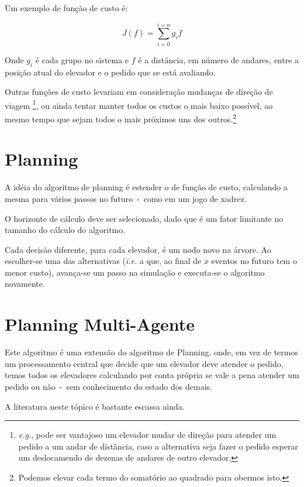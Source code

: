 Um exemplo de função de custo é:

\[
  J(f) = \sum_{i=0}^{i=n} g_{i}f
\]

Onde $g_{i}$ é cada grupo no sistema e $f$ é a distância, em número de andares,
entre a posição atual do elevador e o pedido que se está avaliando.

Outras funções de custo levariam em consideração mudanças de direção de viagem
\footnote{\textit{e.g.}, pode ser vantajoso um elevador mudar de direção para atender um
pedido a um andar de distância, caso a alternativa seja fazer o pedido esperar
um deslocamendo de dezenas de andares de outro elevador.}, ou ainda tentar
manter todos os custos o mais baixo possível, ao mesmo tempo que sejam todos o
mais próximos uns dos outros.\footnote{Podemos elevar cada termo do somatório ao
  quadrado para obermos isto.}

\section{Planning}


A idéia do algoritmo de planning é estender o de função de custo, calculando a
mesma para vários passos no futuro~-~como em um jogo de xadrez.

O horizonte de cálculo deve ser selecionado, dado que é um fator limitante no
tamanho do cálculo do algoritmo.

Cada decisão diferente, para cada elevador, é um nodo novo na árvore. Ao
escolher-se uma das alternativas (\textit{i.e.} a que, ao final de $x$ eventos
no futuro tem o menor custo), avança-se um passo na simulação e executa-se o
algoritmo novamente.

\section{Planning Multi-Agente}

Este algoritmo é uma extensão do algoritmo de Planning, onde, em vez de termos
um processamento central que decide que um elevador deve atender o pedido, temos
todos os elevadores calculando por conta própria se vale a pena atender um
pedido ou não~-~sem conhecimento do estado dos demais.

A literatura neste tópico é bastante escassa ainda.